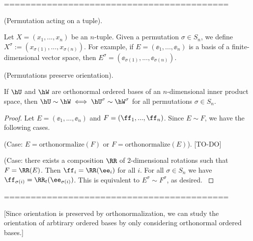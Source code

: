 ==========================================

\begin{defn}
    (Permutation acting on a tuple). 
    
    Let $X = (x_1, ..., x_n)$ be an $n$-tuple. Given a permutation $\sigma \in S_n$, we define $X^\sigma := (x_{\sigma(1)}, ..., x_{\sigma(n)})$. For example, if $E = (\ee_1, ..., \ee_n)$ is a basis of a finite-dimensional vector space, then $E^\sigma = (\ee_{\sigma(1)}, ..., \ee_{\sigma(n)})$.
\end{defn}

\begin{theorem}
    \label{ch::lin_alg::thm::permutations_preserve_rotational_equivalence}

    (Permutations preserve orientation).
    
    If $\hU$ and $\hW$ are orthonormal ordered bases of an $n$-dimensional inner product space, then ${\hU \sim \hW \iff \hU^\sigma \sim \hW^\sigma}$ for all permutations $\sigma \in S_n$.
\end{theorem}

\begin{proof}
    Let $E = (\ee_1, ..., \ee_n)$ and $F = (\ff_1, ..., \ff_n)$. Since $E \sim F$, we have the following cases.

    \fullindent
    {
        (Case: $E = \text{orthonormalize}(F)$ or $F = \text{orthonormalize}(E)$). [TO-DO]
    }

    \fullindent
    {
        (Case: there exists a composition $\RR$ of $2$-dimensional rotations such that $F = \RR(E)$. Then $\ff_i = \RR(\ee_i)$ for all $i$. For all $\sigma \in S_n$ we have $\ff_{\sigma(i)} = \RR_t(\ee_{\sigma(i)})$. This is equivalent to $E^\sigma \sim F^\sigma$, as desired.
    }
\end{proof}

==========================================

[Since orientation is preserved by orthonormalization, we can study the orientation of arbtirary ordered bases by only considering orthonormal ordered bases.]

